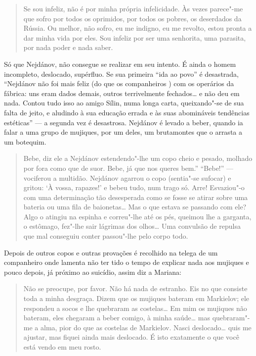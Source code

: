 \begin{quote}
Se sou infeliz, não é por minha própria infelicidade. Às vezes parece"-me
que sofro por todos os oprimidos, por todos os pobres, os deserdados da
Rússia. Ou melhor, não sofro, eu me indigno, eu me revolto, estou pronta
a dar minha vida por eles. Sou infeliz por ser uma senhorita, uma
parasita, por nada poder e nada saber.
\end{quote}

Só que Nejdánov, não consegue se realizar em seu intento. É ainda o
homem incompleto, deslocado, supérfluo. Se sua primeira ``ida ao povo''
é desastrada, ``Nejdánov não foi mais feliz (do que os companheiros
) com os operários da fábrica: uns eram dados demais, outros
terrivelmente fechados\ldots{} e não deu em nada. Contou tudo isso ao amigo
Sílin, numa longa carta, queixando"-se de sua falta de jeito, e aludindo
à sua educação errada e às suas abomináveis tendências estéticas'' --- a
segunda vez é desastrosa. Nejdánov é levado a beber, quando ia falar a
uma grupo de mujiques, por um deles, um brutamontes que o arrasta a um
botequim.

\begin{quote}
Bebe, diz ele a Nejdánov estendendo"-lhe um copo cheio e pesado, molhado
por fora como que de suor. Bebe, já que nos queres bem.'' ``Bebe!'' ---
vociferou a multidão. Nejdánov agarrou o copo (sentia"-se sufocar) e
gritou: `À vossa, rapazes!' e bebeu tudo, num trago só. Arre! Esvaziou"-o
com uma determinação tão desesperada como se fosse se atirar sobre uma
bateria ou uma fila de baionetas\ldots{} Mas o que estava se passando com
ele? Algo o atingiu na espinha e correu"-lhe até os pés, queimou lhe a
garganta, o estômago, fez"-lhe sair lágrimas dos olhos\ldots{} Uma convulsão
de repulsa que mal conseguiu conter passou"-lhe pelo corpo todo.
\end{quote}

Depois de outros copos e outras provações é recolhido na telega de um
companheiro onde lamenta não ter tido o tempo de explicar nada aos
mujiques e pouco depois, já próximo ao suicídio, assim diz a Mariana:

\begin{quote}
Não se preocupe, por favor. Não há nada de estranho. Eis no que consiste
toda a minha desgraça. Dizem que os mujiques bateram em Markielov; ele
respondeu a socos e lhe quebraram as costelas\ldots{} Em mim os mujiques não
bateram, eles chegaram a beber comigo, à minha saúde\ldots{} mas quebraram"-me
a alma, pior do que as costelas de Markielov. Nasci deslocado\ldots{} quis me
ajustar, mas fiquei ainda mais deslocado. É isto exatamente o que você
está vendo em meu rosto.
\end{quote}

